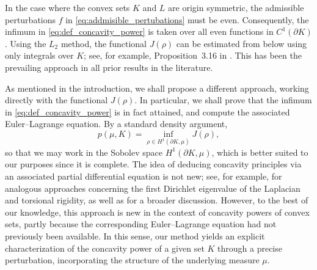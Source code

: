 \documentclass[a4paper, 11pt]{article}
\theoremstyle{definition}
\begin{document}
In the case where the convex sets $K$ and $L$ are origin symmetric, the admissible perturbations $f$ in \eqref{eq:addmisible_pertubations} must be even. Consequently, the infimum in \eqref{eq:def_concavity_power} is taken over all even functions in $C^{1}(\partial K)$. Using the $L_2$ method, the functional $J(\rho)$ can be estimated from below using only integrals over $K$; see, for example, Proposition~3.16 in \cite{GalynaStability}. This has been the prevailing approach in all prior results in the literature.

As mentioned in the introduction, we shall propose a different approach, working directly with the functional $J(\rho)$. In particular, we shall prove that the infimum in \eqref{eq:def_concavity_power} is in fact attained, and compute the associated Euler--Lagrange equation. By a standard density argument,
\begin{equation}\label{eq:concavity_power_Sobolev}
p(\mu,K)= \inf_{\rho \in H^{1}(\partial K,\mu)} J(\rho),
\end{equation}
so that we may work in the Sobolev space $H^{1}(\partial K,\mu)$, which is better suited to our purposes since it is complete. The idea of deducing concavity principles via an associated partial differential equation is not new; see, for example, \cite{Colesanti_eigenvalue_concavity,Borell_Torsional_rigidity} for analogous approaches concerning the first Dirichlet eigenvalue of the Laplacian and torsional rigidity, as well as \cite[Section 4]{Salani_elliptic_PDE} for a broader discussion. However, to the best of our knowledge, this approach is new in the context of concavity powers of convex sets, partly because the corresponding Euler--Lagrange equation had not previously been available. In this sense, our method yields an explicit characterization of the concavity power of a given set $K$ through a precise perturbation, incorporating the structure of the underlying measure $\mu$.

\medskip
\end{document}
